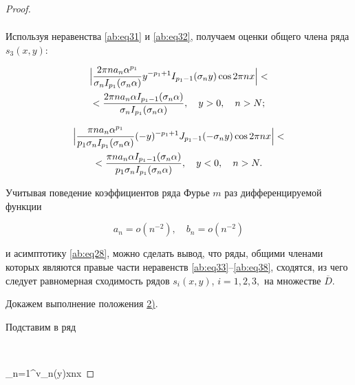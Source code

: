 \begin{proof}
\begin{multline}
\end{multline}







Используя неравенства \eqref{ab:eq31} и \eqref{ab:eq32}, получаем оценки общего члена ряда $s_3(x,y)$:

\begin{multline}

\label{ab:eq38}

\Bigl|\frac{2\pi na_n\alpha^{p_1}}{\sigma_nI_{p_1}(\sigma_n\alpha)}y^{-p_1+1}I_{p_1-1}(\sigma_n y)\cos2\pi nx\Bigr| < \\

<\frac{2\pi na_n\alpha I_{p_1-1}(\sigma_n\alpha)}{\sigma_n I_{p_1}(\sigma_n\alpha)},\quad y>0, \quad n >N;

\end{multline}

\begin{multline}

\label{ab:eq38}

\Bigl|\frac{\pi na_n\alpha^{p_1}}{p_1\sigma_nI_{p_1}(\sigma_n\alpha)}(-y)^{-p_1+1}J_{p_1-1}(-\sigma_n y)\cos2\pi nx\Bigr|< \\

<\frac{\pi na_n\alpha I_{p_1-1}(\sigma_n\alpha)}{p_1\sigma_nI_{p_1}(\sigma_n\alpha)},\quad y<0, \quad n>N.

\end{multline}





Учитывая поведение коэффициентов ряда Фурье $m$ раз дифференцируемой функции \cite[c.~636]{ab:bib:Zorich} 

$$

a_n=o\left(n^{-2}\right),\quad b_n=o\left(n^{-2}\right)$$ 

и асимптотику \eqref{ab:eq28}, можно сделать вывод, что ряды, общими членами которых являются правые части неравенств \eqref{ab:eq33}--\eqref{ab:eq38}, сходятся, из чего следует равномерная сходимость рядов $s_i(x,y)$, $i=1, 2, 3,$ на множестве $\overline{D}$.







Докажем выполнение положения \hyperlink{ab:2}{2)}.

Подставим в ряд 

$$

\sum\limits_{n=1}^{\infty}v_n(y)x\pi nx


\end{proof}
